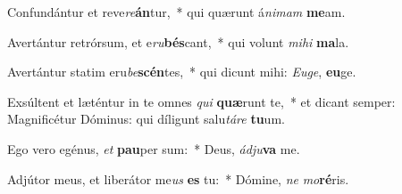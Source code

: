 \item Confundántur et reve\textit{re}\textbf{án}tur,~* qui quærunt á\textit{ni}\textit{mam} \textbf{me}am.
\item Avertántur retrórsum, et e\textit{ru}\textbf{bés}cant,~* qui volunt \textit{mi}\textit{hi} \textbf{ma}la.
\item Avertántur statim eru\textit{be}\textbf{scén}tes,~* qui dicunt mihi: \textit{Eu}\textit{ge}, \textbf{eu}ge.
\item Exsúltent et læténtur in te omnes \textit{qui} \textbf{quæ}runt te,~* et dicant semper: Magnificétur Dóminus: qui díligunt salu\textit{tá}\textit{re} \textbf{tu}um.
\item Ego vero egénus, \textit{et} \textbf{pau}per sum:~* Deus, \textit{ád}\textit{ju}\textbf{va} me.
\item Adjútor meus, et liberátor me\textit{us} \textbf{es} tu:~* Dómine, \textit{ne} \textit{mo}\textbf{ré}ris.
